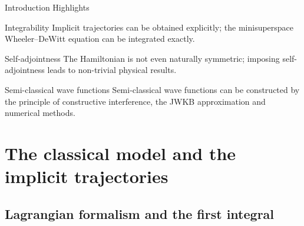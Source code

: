 \documentclass[8pt]{beamer}
\begin{document}
\begin{frame}%
{Introduction}%
{Highlights}
\begin{block}{Integrability}
Implicit trajectories can be obtained explicitly;
the minisuperspace Wheeler--DeWitt equation can be integrated exactly.
\end{block}

\begin{block}{Self-adjointness}
The Hamiltonian is not even naturally symmetric;
imposing self-adjointness leads to non-trivial physical results.
\end{block}

\begin{block}{Semi-classical wave functions}
Semi-classical wave functions can be constructed by the principle of
constructive interference, the JWKB approximation and numerical methods.
\end{block}

\end{frame}

\section{The classical model and the implicit trajectories}

\subsection{Lagrangian formalism and the first integral}
\end{document}
